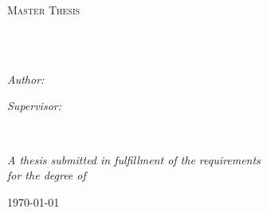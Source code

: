 \documentclass[
11pt, %
english, %
singlespacing, %
headsepline, %
]{MastersDoctoralThesis} %
\author{Peter Pommergård \textsc{Lind}} %
\theoremstyle{assumption}
\theoremstyle{definition}
\theoremstyle{proposition}
\begin{document}
\frontmatter %

\pagestyle{plain} %


\begin{titlepage}
\begin{center}

\vspace*{.06\textheight}
{\scshape\LARGE \univname\par}\vspace{1.5cm} %
\textsc{\Large Master Thesis}\\[0.5cm] %

\HRule \\[0.4cm] %
{\huge \bfseries \ttitle\par}\vspace{0.4cm} %
\HRule \\[1.5cm] %
 
\begin{minipage}[t]{0.4\textwidth}
\begin{flushleft} \large
\emph{Author:}\\
\href{http://www.johnsmith.com}{\authorname} %
\end{flushleft}
\end{minipage}
\begin{minipage}[t]{0.4\textwidth}
\begin{flushright} \large
\emph{Supervisor:} \\
\href{http://www.jamessmith.com}{\supname} %
\end{flushright}
\end{minipage}\\[3cm]
 
\vfill

\large \textit{A thesis submitted in fulfillment of the requirements\\ for the degree of \degreename}\\[0.3cm] %
 
\vfill

{\large \today}\\[4cm] %
 
\vfill
\end{center}
\end{titlepage}
\end{document}
